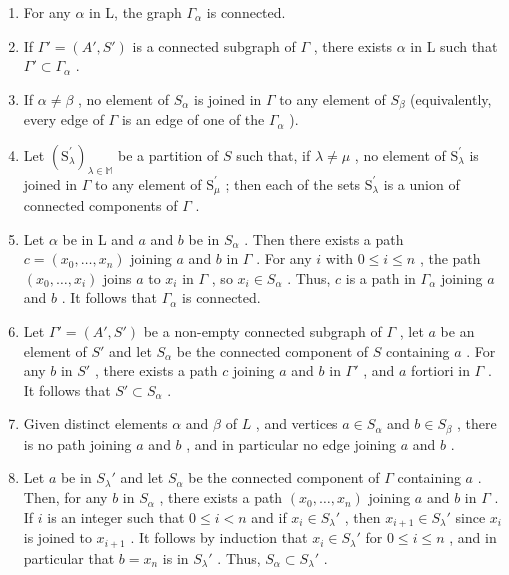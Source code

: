 \begin{enumerate}
\def\labelenumi{(\roman{enumi})}
\item
  For any \(\alpha\) in L, the graph \(\Gamma_{\alpha}\) is connected.
\item
  If \(\Gamma' = (A', S')\) is a connected subgraph of \(\Gamma\) , there exists \(\alpha\) in L such that \(\Gamma' \subset \Gamma_{\alpha}\) .
\item
  If \(\alpha \neq \beta\) , no element of \(S_{\alpha}\) is joined in \(\Gamma\) to any element of \(S_{\beta}\) (equivalently, every edge of \(\Gamma\) is an edge of one of the \(\Gamma_{\alpha}\) ).
\item
  Let \((\mathrm{S}_{\lambda}^{\prime})_{\lambda \in \mathbb{M}}\) be a partition of \(S\) such that, if \(\lambda \neq \mu\) , no element of \(\mathrm{S}_{\lambda}^{\prime}\) is joined in \(\Gamma\) to any element of \(\mathrm{S}_{\mu}^{\prime}\) ; then each of the sets \(\mathrm{S}_{\lambda}^{\prime}\) is a union of connected components of \(\Gamma\) .
\item
  Let \(\alpha\) be in L and \(a\) and \(b\) be in \(S_{\alpha}\) . Then there exists a path \(c = (x_0, \ldots, x_n)\) joining \(a\) and \(b\) in \(\Gamma\) . For any \(i\) with \(0 \leqslant i \leqslant n\) , the path \((x_0, \ldots, x_i)\) joins \(a\) to \(x_i\) in \(\Gamma\) , so \(x_i \in S_{\alpha}\) . Thus, \(c\) is a path in \(\Gamma_{\alpha}\) joining \(a\) and \(b\) . It follows that \(\Gamma_{\alpha}\) is connected.
\item
  Let \(\Gamma' = (A', S')\) be a non-empty connected subgraph of \(\Gamma\) , let \(a\) be an element of \(S'\) and let \(S_{\alpha}\) be the connected component of \(S\) containing \(a\) . For any \(b\) in \(S'\) , there exists a path \(c\) joining \(a\) and \(b\) in \(\Gamma'\) , and \(a\) fortiori in \(\Gamma\) . It follows that \(S' \subset S_{\alpha}\) .
\item
  Given distinct elements \(\alpha\) and \(\beta\) of \(L\) , and vertices \(a \in S_{\alpha}\) and \(b \in S_{\beta}\) , there is no path joining \(a\) and \(b\) , and in particular no edge joining \(a\) and \(b\) .
\item
  Let \(a\) be in \(S_{\lambda}'\) and let \(S_{\alpha}\) be the connected component of \(\Gamma\) containing \(a\) . Then, for any \(b\) in \(S_{\alpha}\) , there exists a path \((x_0, \ldots, x_n)\) joining \(a\) and \(b\) in \(\Gamma\) . If \(i\) is an integer such that \(0 \leqslant i < n\) and if \(x_i \in S_{\lambda}'\) , then \(x_{i+1} \in S_{\lambda}'\) since \(x_i\) is joined to \(x_{i+1}\) . It follows by induction that \(x_i \in S_{\lambda}'\) for \(0 \leqslant i \leqslant n\) , and in particular that \(b = x_n\) is in \(S_{\lambda}'\) . Thus, \(S_{\alpha} \subset S_{\lambda}'\) .
\end{enumerate}

